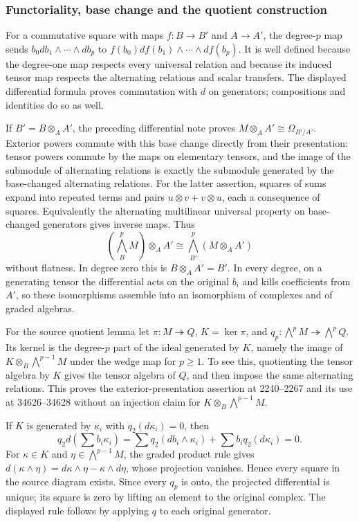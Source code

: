 \subsubsection{Functoriality, base change and the quotient construction}\label{algebra-proof-042-functoriality-base-change-and-the-quotient-construction}

For a commutative square with maps \(f:B\to B'\) and \(A\to A'\), the degree-\(p\) map sends \(b_0db_1\wedge\cdots\wedge db_p\) to \(f(b_0)df(b_1)\wedge\cdots\wedge df(b_p)\). It is well defined because the degree-one map respects every universal relation and because its induced tensor map respects the alternating relations and scalar transfers. The displayed differential formula proves commutation with \(d\) on generators; compositions and identities do so as well.

If \(B'=B\otimes_A A'\), the preceding differential note proves \(M\otimes_A A'\cong\Omega_{B'/A'}\). Exterior powers commute with this base change directly from their presentation: tensor powers commute by the maps on elementary tensors, and the image of the submodule of alternating relations is exactly the submodule generated by the base-changed alternating relations. For the latter assertion, squares of sums expand into repeated terms and pairs \(u\otimes v+v\otimes u\), each a consequence of squares. Equivalently the alternating multilinear universal property on base-changed generators gives inverse maps. Thus \[
(\bigwedge_B^pM)\otimes_A A'\cong\bigwedge_{B'}^p(M\otimes_A A')
\] without flatness. In degree zero this is \(B\otimes_A A'=B'\). In every degree, on a generating tensor the differential acts on the original \(b_i\) and kills coefficients from \(A'\), so these isomorphisms assemble into an isomorphism of complexes and of graded algebras.

For the source quotient lemma let \(\pi:M\twoheadrightarrow Q\), \(K=\ker\pi\), and \(q_p:\bigwedge^pM\twoheadrightarrow\bigwedge^pQ\). Its kernel is the degree-\(p\) part of the ideal generated by \(K\), namely the image of \(K\otimes_B\bigwedge^{p-1}M\) under the wedge map for \(p\ge1\). To see this, quotienting the tensor algebra by \(K\) gives the tensor algebra of \(Q\), and then impose the same alternating relations. This proves the exterior-presentation assertion at 2240--2267 and its use at 34626--34628 without an injection claim for \(K\otimes_B\bigwedge^{p-1}M\).

If \(K\) is generated by \(\kappa_i\) with \(q_2(d\kappa_i)=0\), then \[
q_2d\left(\sum b_i\kappa_i\right)
=\sum q_2(db_i\wedge\kappa_i)+\sum b_iq_2(d\kappa_i)=0.
\] For \(\kappa\in K\) and \(\eta\in\bigwedge^{p-1}M\), the graded product rule gives \(d(\kappa\wedge\eta)=d\kappa\wedge\eta-\kappa\wedge d\eta\), whose projection vanishes. Hence every square in the source diagram exists. Since every \(q_p\) is onto, the projected differential is unique; its square is zero by lifting an element to the original complex. The displayed rule follows by applying \(q\) to each original generator.

